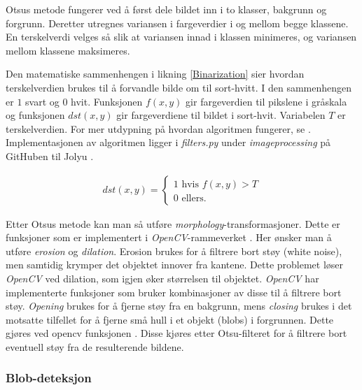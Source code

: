 Otsus metode fungerer ved å først dele bildet inn i to klasser, bakgrunn og forgrunn. 
Deretter utregnes variansen i fargeverdier i og mellom begge klassene.
En terskelverdi velges så slik at variansen innad i klassen minimeres, og variansen mellom klassene maksimeres. 


Den matematiske sammenhengen i likning \eqref{Binarization} sier hvordan terskelverdien brukes til å forvandle bilde om til sort-hvitt. 
I den sammenhengen er $1$ svart og $0$ hvit. 
Funksjonen $f(x,y)$ gir fargeverdien til pikslene i gråskala og funksjonen $dst(x,y)$ gir fargeverdiene til bildet i sort-hvit. 
Variabelen $T$ er terskelverdien. 
For mer utdypning på hvordan algoritmen fungerer, se \cite{otsu}.
Implementasjonen av algoritmen  ligger i \textit{filters.py} under \textit{image\textunderscore processing} på GitHuben til Jolyu \cite{GitHub}.


\begin{align}
    dst(x,y)= \begin{cases} 
        1 \text{ hvis } f(x,y) > T\\
        0 \text{ ellers.}
   \end{cases}\label{Binarization}
\end{align}



Etter Otsus metode kan man så utføre \textit{morphology}-transformasjoner. 
Dette er funksjoner som er implementert i \textit{OpenCV}-rammeverket \cite{morph}. 
Her ønsker man å utføre \textit{erosion} og \textit{dilation}. 
Erosion brukes for å filtrere bort støy (white noise), men samtidig krymper det objektet innover fra kantene. 
Dette problemet løser \textit{OpenCV} ved dilation, som igjen øker størrelsen til objektet.
\textit{OpenCV} har implementerte funksjoner som bruker kombinasjoner av disse til å filtrere bort støy. 
\textit{Opening} brukes for å fjerne støy fra en bakgrunn, mens \textit{closing} brukes i det motsatte tilfellet for å fjerne små hull i et objekt (blobs) i forgrunnen. Dette gjøres ved opencv funksjonen .
Disse kjøres etter Otsu-filteret for å filtrere bort eventuell støy fra de resulterende bildene.


\subsubsection{Blob-deteksjon}\label{sec:impl:programvare:blob-detection}

